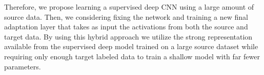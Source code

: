 Therefore, we propose learning a supervised deep CNN using a large amount of source data. Then, we considering fixing the network and training a new final adaptation layer that takes as input the activations from both the source and target data. By using this hybrid approach we utilize the strong representation available from the supervised deep model trained on a large source dataset while requiring only enough target labeled data to train a shallow model with far fewer parameters. 





